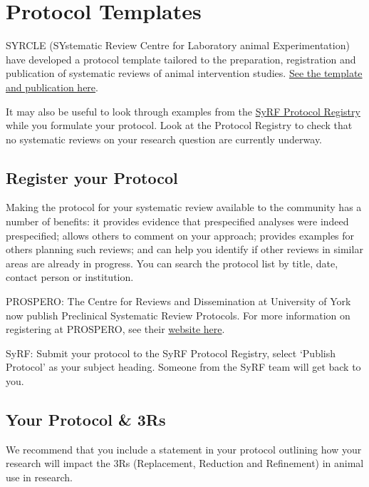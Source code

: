 \documentclass[
]{book}
\begin{document}
\hypertarget{protocol-templates}{%
\section{Protocol Templates}\label{protocol-templates}}

SYRCLE (SYstematic Review Centre for Laboratory animal Experimentation) have developed a protocol template tailored to the preparation, registration and publication of systematic reviews of animal intervention studies. \href{https://onlinelibrary.wiley.com/doi/epdf/10.1002/ebm2.7}{See the template and publication here}.

It may also be useful to look through examples from the \href{http://syrf.org.uk/protocols/}{SyRF Protocol Registry} while you formulate your protocol. Look at the Protocol Registry to check that no systematic reviews on your research question are currently underway.

\hypertarget{register-your-protocol}{%
\subsection{Register your Protocol}\label{register-your-protocol}}

Making the protocol for your systematic review available to the community has a number of benefits: it provides evidence that prespecified analyses were indeed prespecified; allows others to comment on your approach; provides examples for others planning such reviews; and can help you identify if other reviews in similar areas are already in progress. You can search the protocol list by title, date, contact person or institution.

PROSPERO:
The Centre for Reviews and Dissemination at University of York now publish Preclinical Systematic Review Protocols.
For more information on registering at PROSPERO, see their \href{https://www.crd.york.ac.uk/prospero/}{website here}.

SyRF:
Submit your protocol to the SyRF Protocol Registry, select `Publish Protocol' as your subject heading. Someone from the SyRF team will get back to you.

\hypertarget{your-protocol-3rs}{%
\subsection{Your Protocol \& 3Rs}\label{your-protocol-3rs}}

We recommend that you include a statement in your protocol outlining how your research will impact the 3Rs (Replacement, Reduction and Refinement) in animal use in research.
\end{document}
